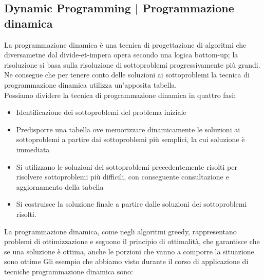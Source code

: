 \documentclass[11pt, oneside]{article}   	%
\begin{document}
\subsection{Dynamic Programming | Programmazione dinamica}
La programmazione dinamica è una tecnica di progettazione di algoritmi che diversametne dal divide-et-impera opera secondo una logica bottom-up; la risoluzione si basa sulla risoluzione di sottoproblemi progressivamente più grandi. Ne consegue che per tenere conto delle soluzioni ai sottoproblemi la tecnica di programmazione dinamica utilizza un'apposita tabella.\\
Possiamo dividere la tecnica di programmazione dinamica in quattro fasi:
\begin{itemize}
\item Identificazione dei sottoproblemi del problema iniziale
\item Predisporre una tabella ove memorizzare dinamicamente le soluzioni ai sottoproblemi a partire dai sottoproblemi più semplici, la cui soluzione è immediata
\item Si utilizzano le soluzioni dei sottoproblemi precedentemente risolti per risolvere sottoproblemi più difficili, con conseguente consultazione e aggiornamento della tabella
\item Si costruisce la soluzione finale a partire dalle soluzioni dei sottoproblemi risolti.
\end{itemize}
La programmazione dinamica, come negli algoritmi greedy, rappresentano problemi di ottimizzazione e seguono il principio di ottimalità, che garantisce che se una soluzione è ottima, anche le porzioni che vanno a comporre la situazione sono ottime
Gli esempio che abbiamo visto durante il corso di applicazione di tecniche programmazione dinamica sono:
\end{document}

